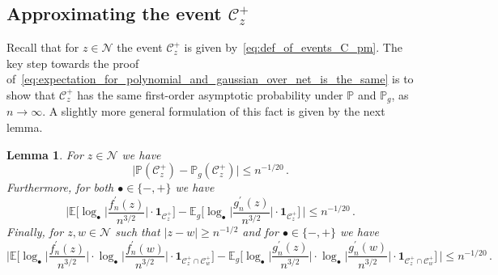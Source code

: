 \documentclass[11pt]{amsart}
\newtheorem{lemma}[theorem]{Lemma}
\theoremstyle{remark}
\theoremstyle{definition}
\newcommand{\bP}{\mathbb P}
\newcommand{\bE}{\mathbb E}
\newcommand{\cC}{\mathcal C}
\newcommand{\cN}{\mathcal N}
\newcommand{\one}{\boldsymbol{1}}
\begin{document}
    \subsection{Approximating the event $\cC_z^+$}
    Recall that for $z \in \cN$ the event $\cC_z^+$ is given by~\eqref{eq:def_of_events_C_pm}. The key step towards the proof of~\eqref{eq:expectation_for_polynomial_and_gaussian_over_net_is_the_same} is to show that $\cC_z^+$ has the same first-order asymptotic probability under $\bP$ and $\bP_g$, as $n\to\infty$. A slightly more general formulation of this fact is given by the next lemma. 
    \begin{lemma}
        \label{lemma:comparison_with_a_gaussian_on_the_event_C_pm}
        For $z\in \cN$ we have
        \begin{equation}
        \label{eq:lemma_comparison_with_a_gaussian_on_the_event_C_pm_first}
            \Big| \bP(\cC_z^+) - \bP_g(\cC_z^+) \Big| \le n^{-1/20} \, .
        \end{equation}
        Furthermore, for both $\bullet\in\{-,+\}$ we have
        \begin{equation}
        \label{eq:lemma_comparison_with_a_gaussian_on_the_event_C_pm_second}
            \bigg| \bE\Big[ \log_\bullet \Big|\frac{f_n^\prime(z)}{n^{3/2}}\Big| \cdot \one_{\cC_z^+} \Big]  - \bE_g\Big[ \log_\bullet \Big|\frac{g_n^\prime(z)}{n^{3/2}}\Big| \cdot \one_{\cC_z^+} \Big] \, \bigg|\le n^{-1/20} \, .
        \end{equation}
        Finally, for $z,w\in \cN$ such that $|z-w|\ge n^{-1/2}$ and for $\bullet\in\{-,+\}$ we have
        \begin{equation}
        \label{eq:lemma_comparison_with_a_gaussian_on_the_event_C_pm_third}
            \bigg| \bE\Big[ \log_\bullet \Big|\frac{f_n^\prime(z)}{n^{3/2}}\Big| \cdot \log_\bullet \Big|\frac{f_n^\prime(w)}{n^{3/2}}\Big| \cdot \one_{\cC_z^+\cap \cC_w^{+}} \Big]  - \bE_g\Big[ \log_\bullet \Big|\frac{g_n^\prime(z)}{n^{3/2}}\Big| \cdot \log_\bullet \Big|\frac{g_n^\prime(w)}{n^{3/2}}\Big| \cdot \one_{\cC_z^+\cap \cC_w^{+}} \Big] \, \bigg|\le n^{-1/20} \, .
        \end{equation}
    \end{lemma}
\end{document}

